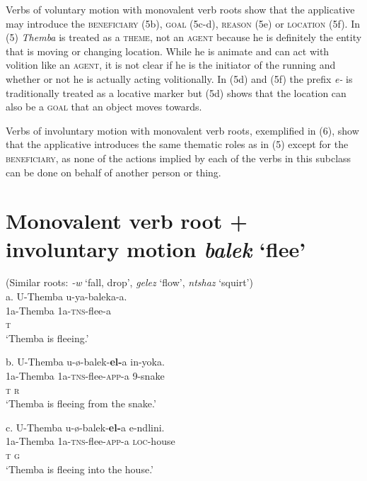 Verbs of voluntary motion with monovalent verb roots show that the applicative may introduce the \textsc{beneficiary }(5b), \textsc{goal }(5c-d), \textsc{reason }(5e) or \textsc{location }(5f). In (5) \textit{Themba} is treated as a \textsc{theme}, not an \textsc{agent} because he is definitely the entity that is moving or changing location. While he is animate and can act with volition like an \textsc{agent,} it is not clear if he is the initiator of the running and whether or not he is actually acting volitionally. In (5d) and (5f) the prefix \textit{e-} is traditionally treated as a locative marker but (5d) shows that the location can also be a \textsc{goal} that an object moves towards.

  Verbs of involuntary motion with monovalent verb roots, exemplified in (6), show that the applicative introduces the same thematic roles as in (5) except for the \textsc{beneficiary,} as none of the actions implied by each of the verbs in this subclass can be done on behalf of another person or thing.

\chapter[Monovalent verb root + involuntary motion balek ‘flee’]{Monovalent verb root + involuntary motion \textit{balek }‘flee’}
     (Similar roots: \textit{{}-w} ‘fall, drop’, \textit{gelez} ‘flow’, \textit{ntshaz} ‘squirt’)\\
\gll   a.  U-Themba   u-ya-baleka-a. \\
         1a-Themba     1a-\textsc{tns}{}-flee-a \\
         \textsc{t}\\
\glt     ‘Themba is fleeing.’
\z

\gll   b.  U-Themba   u-ø-balek-\textbf{el-}a     in-yoka. \\
         1a-Themba     1a-\textsc{tns}{}-flee-\textsc{app}{}-a  9-snake\\
         \textsc{t                  r}\\
\glt     ‘Themba is fleeing from the snake.’   
\z

\gll   c.  U-Themba   u-ø-balek-\textbf{el-}a        e-ndlini. \\
         1a-Themba     1a-\textsc{tns}{}-flee-\textsc{app}{}-a  \textsc{loc}{}-house\\
         \textsc{t                  g}\\
\glt     ‘Themba is fleeing into the house.’
\z

